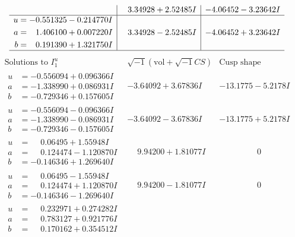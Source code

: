 \documentclass[1p]{elsarticle_modified}
\theoremstyle{definition}
\newcommand{\I}{\sqrt{-1}}
\begin{document}
$$\begin{array}{c|c|c}
 & \phantom{-}3.34928 + 2.52485 I & -4.06452 - 3.23642 I \\ \hline\begin{aligned}
u &= -0.551325 - 0.214770 I \\
a &= \phantom{-}1.406100 + 0.007220 I \\
b &= \phantom{-}0.191390 + 1.321750 I\end{aligned}
 & \phantom{-}3.34928 - 2.52485 I & -4.06452 + 3.23642 I\\
 \hline 
 \end{array}$$\newpage$$\begin{array}{c|c|c}  
\text{Solutions to }I^u_{1}& \I (\text{vol} + \sqrt{-1}CS) & \text{Cusp shape}\\
 \hline 
\begin{aligned}
u &= -0.556094 + 0.096366 I \\
a &= -1.338990 + 0.086931 I \\
b &= -0.729346 + 0.157605 I\end{aligned}
 & -3.64092 + 3.67836 I & -13.1775 - 5.2178 I \\ \hline\begin{aligned}
u &= -0.556094 - 0.096366 I \\
a &= -1.338990 - 0.086931 I \\
b &= -0.729346 - 0.157605 I\end{aligned}
 & -3.64092 - 3.67836 I & -13.1775 + 5.2178 I \\ \hline\begin{aligned}
u &= \phantom{-}0.06495 + 1.55948 I \\
a &= \phantom{-}0.124474 - 1.120870 I \\
b &= -0.146346 + 1.269640 I\end{aligned}
 & \phantom{-}9.94200 + 1.81077 I & \phantom{-0.000000 } 0 \\ \hline\begin{aligned}
u &= \phantom{-}0.06495 - 1.55948 I \\
a &= \phantom{-}0.124474 + 1.120870 I \\
b &= -0.146346 - 1.269640 I\end{aligned}
 & \phantom{-}9.94200 - 1.81077 I & \phantom{-0.000000 } 0 \\ \hline\begin{aligned}
u &= \phantom{-}0.232971 + 0.274282 I \\
a &= \phantom{-}0.783127 + 0.921776 I \\
b &= \phantom{-}0.170162 + 0.354512 I\end{aligned}

\end{array}$$
\end{document}
